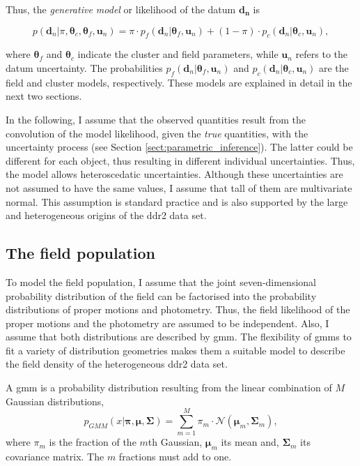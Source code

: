 Thus, the \emph{generative model} or likelihood of the datum $\mathbf{d_n}$  is

\begin{equation}
\label{eq:genmod}
p(\mathbf{d}_n | \pi,\boldsymbol{\theta}_c,\boldsymbol{\theta}_f,\mathbf{u}_n)=\pi \cdot p_f(\mathbf{d}_n|\boldsymbol{\theta}_f,\mathbf{u}_n) + (1-\pi)\cdot p_c(\mathbf{d}_n| \boldsymbol{\theta}_c,\mathbf{u}_n),
\end{equation}

where $\boldsymbol{\theta}_f$ and $\boldsymbol{\theta}_c$ indicate the cluster and field parameters, while $\mathbf{u}_n$ refers to the datum uncertainty. The probabilities $p_f(\mathbf{d}_n|\boldsymbol{\theta}_f,\mathbf{u}_n)$ and $p_c(\mathbf{d}_n| \boldsymbol{\theta}_c,\mathbf{u}_n)$ are the field and cluster models, respectively. These models are explained in detail in the next two sections.

In the following, I assume that the observed quantities result from the convolution of the model likelihood, given the \emph{true} quantities, with the uncertainty process (see Section \ref{sect:parametric_inference}). The latter could be different for each object, thus resulting in different individual uncertainties. Thus, the model allows heteroscedatic uncertainties. Although these uncertainties are not assumed to have the same values, I assume that tall of them are multivariate normal.  This assumption is standard practice and is also supported by the large and heterogeneous origins of the \gls{ddr2} data set. 

\subsection{The field population}
\label{sect:field_population}
To model the field population, I assume that the joint seven-dimensional probability distribution of the field can be factorised into the probability distributions of proper motions and photometry. Thus, the field likelihood of the proper motions and the photometry are assumed to be independent. Also, I assume that both distributions are described by \gls{gmm}. The flexibility of \glspl{gmm} to fit a variety of distribution geometries makes them a suitable model to describe the field density of the heterogeneous \gls{ddr2} data set. 

A \gls{gmm} is a probability distribution resulting from the linear combination of $M$ Gaussian distributions, 
\begin{equation}
p_{GMM}(x|\boldsymbol{\pi},\boldsymbol{\mu},\boldsymbol{\Sigma})=\sum_{m=1}^M \pi_m \cdot \mathcal{N}(\boldsymbol{\mu}_m,\boldsymbol{\Sigma}_m),
\end{equation}
{where $\pi_m$ is the fraction of the $m$th Gaussian, $\boldsymbol{\mu}_m$ its mean and, $\boldsymbol{\Sigma}_m$ its covariance matrix. The $m$ fractions must add to one. }

